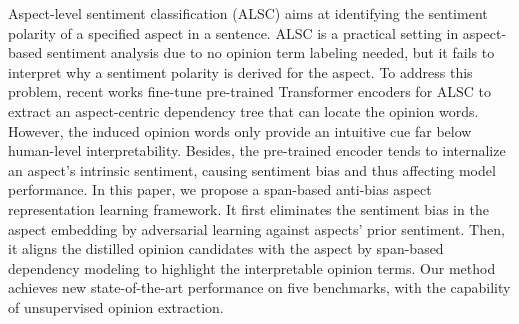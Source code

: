 Aspect-level sentiment classification (ALSC) aims at identifying the sentiment polarity of a specified aspect in a sentence. ALSC is a practical setting in aspect-based sentiment analysis due to no opinion term labeling needed, but it fails to interpret why a sentiment polarity is derived for the aspect. To address this problem, recent works fine-tune pre-trained Transformer encoders for ALSC to extract an aspect-centric dependency tree that can locate the opinion words. However, the induced opinion words only provide an intuitive cue far below human-level interpretability. Besides, the pre-trained encoder tends to internalize an aspect's intrinsic sentiment, causing sentiment bias and thus affecting model performance. In this paper, we propose a span-based anti-bias aspect representation learning framework. It first eliminates the sentiment bias in the aspect embedding by adversarial learning against aspects' prior sentiment. Then, it aligns the distilled opinion candidates with the aspect by span-based dependency modeling to highlight the interpretable opinion terms. Our method achieves new state-of-the-art performance on five benchmarks, with the capability of unsupervised opinion extraction.
